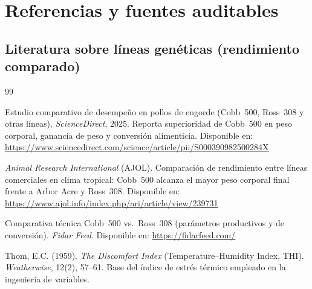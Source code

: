 \documentclass[11pt,a4paper]{article}
\begin{document}
\section{Referencias y fuentes auditables}
\label{sec:refs}

\subsection*{Literatura sobre líneas genéticas (rendimiento comparado)}
\begin{thebibliography}{99}
\setlength{\itemsep}{2pt}

 Estudio comparativo de desempeño en pollos de engorde (Cobb~500, Ross~308 y
otras líneas), \emph{ScienceDirect}, 2025. Reporta superioridad de Cobb~500 en peso corporal, ganancia
de peso y conversión alimenticia. Disponible en:
\url{https://www.sciencedirect.com/science/article/pii/S000390982500284X}

 \emph{Animal Research International} (AJOL). Comparación de rendimiento entre líneas
comerciales en clima tropical: Cobb~500 alcanza el mayor peso corporal final frente a Arbor Acre y
Ross~308. Disponible en: \url{https://www.ajol.info/index.php/ari/article/view/239731}

 Comparativa técnica Cobb~500 vs.\ Ross~308 (parámetros productivos y de conversión).
\emph{Fidar Feed}. Disponible en: \url{https://fidarfeed.com/}

 Thom, E.C. (1959). \emph{The Discomfort Index} (Temperature--Humidity Index, THI).
\emph{Weatherwise}, 12(2), 57--61. Base del índice de estrés térmico empleado en la ingeniería de variables.
\end{thebibliography}
\end{document}
